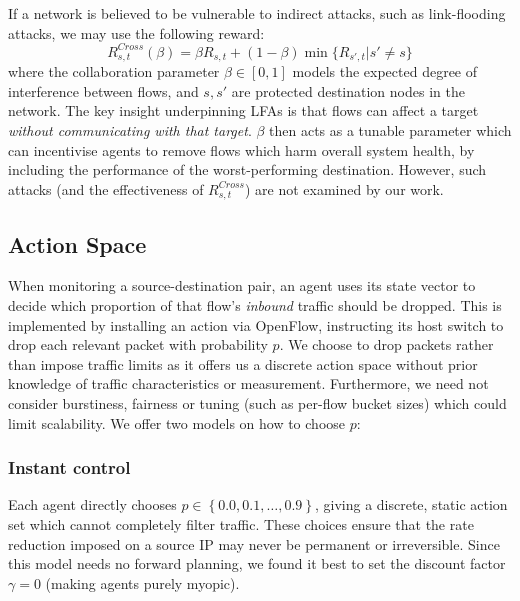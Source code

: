 \documentclass[10pt, times, comsoc]{IEEEtran}
\begin{document}
If a network is believed to be vulnerable to indirect attacks, such as link-flooding attacks, we may use the following reward:
\begin{equation}
	R_{s,t}^{\mathit{Cross}}(\beta) = \beta R_{s,t} + (1 - \beta) \min{\{R_{s',t} | s' \ne s\}} \label{eqn:lfa-reward}
\end{equation}
where the collaboration parameter $\beta \in [0,1]$ models the expected degree of interference between flows, and $s, s'$ are protected destination nodes in the network.
The key insight underpinning LFAs is that flows can affect a target \emph{without communicating with that target}.
$\beta$ then acts as a tunable parameter which can incentivise agents to remove flows which harm overall system health, by including the performance of the worst-performing destination.
However, such attacks (and the effectiveness of $R_{s,t}^{\mathit{Cross}}$) are not examined by our work.

\subsection{Action Space}
When monitoring a source-destination pair, an agent uses its state vector to decide which proportion of that flow's \emph{inbound} traffic should be dropped.
This is implemented by installing an action via OpenFlow, instructing its host switch to drop each relevant packet with probability $p$.
We choose to drop packets rather than impose traffic limits as it offers us a discrete action space without prior knowledge of traffic characteristics or measurement.
Furthermore, we need not consider burstiness, fairness or tuning (such as per-flow bucket sizes) which could limit scalability.
We offer two models on how to choose $p$:

\subsubsection{Instant control}
Each agent directly chooses $p \in \left\{ 0.0, 0.1, \ldots, 0.9 \right\}$, giving a discrete, static action set which cannot completely filter traffic.
These choices ensure that the rate reduction imposed on a source IP may never be permanent or irreversible.
Since this model needs no forward planning, we found it best to set the discount factor $\gamma=0$ (making agents purely myopic).
\end{document}
